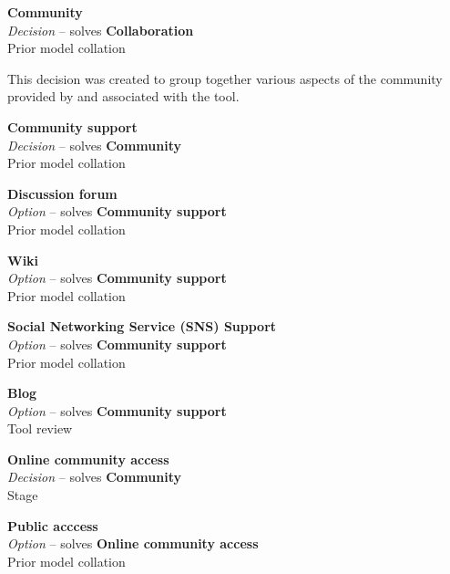 \textbf{Community} \\ \emph{Decision} -- solves \textbf{Collaboration} \\ Prior model collation

This decision was created to group together various aspects of the community provided by and associated with the tool.

\textbf{Community support} \\ \emph{Decision} -- solves \textbf{Community} \\ Prior model collation \cite{Aghaee2012}

\textbf{Discussion forum} \\ \emph{Option} -- solves \textbf{Community support} \\ Prior model collation \cite{Grammel2010}

\textbf{Wiki} \\ \emph{Option} -- solves \textbf{Community support} \\ Prior model collation \cite{Aghaee2012}


\textbf{Social Networking Service (SNS) Support} \\ \emph{Option} -- solves \textbf{Community support} \\ Prior model collation \cite{Grammel2010}

\textbf{Blog} \\ \emph{Option} -- solves \textbf{Community support} \\ Tool review

\textbf{Online community access} \\ \emph{Decision} -- solves \textbf{Community} \\ Stage \cite{Aghaee2012}


\textbf{Public acccess} \\ \emph{Option} -- solves \textbf{Online community access} \\ Prior model collation \cite{Aghaee2012}

